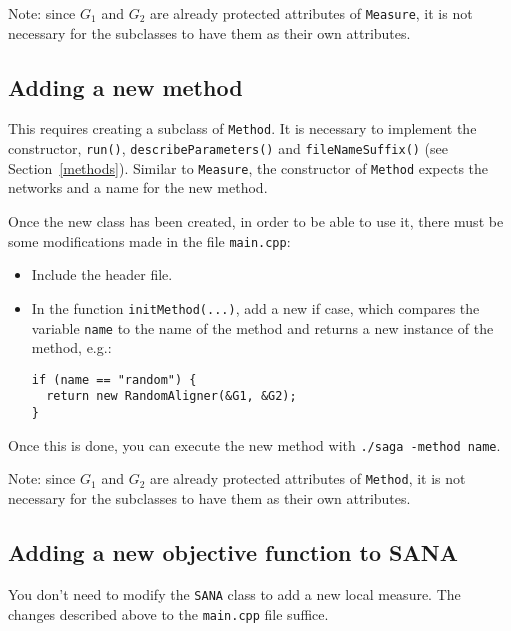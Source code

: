 \documentclass[]{article}
\begin{document}
Note: since $G_1$ and $G_2$ are already protected attributes of \texttt{Measure}, it is not necessary for the subclasses to have them as their own attributes.

\subsection{Adding a new method}
This requires creating a subclass of \texttt{Method}. It is necessary to implement the constructor, \texttt{run()}, \texttt{describeParameters()} and \texttt{fileNameSuffix()} (see Section~\ref{methods}). Similar to \texttt{Measure}, the constructor of \texttt{Method} expects the networks and a name for the new method.

Once the new class has been created, in order to be able to use it, there must be some modifications made in the file \texttt{main.cpp}:
\begin{itemize}
\item Include the header file.
\item In the function \texttt{initMethod(...)}, add a new if case, which compares the variable \texttt{name} to the name of the method and returns a new instance of the method, e.g.:
\begin{verbatim}
if (name == "random") {
  return new RandomAligner(&G1, &G2);
}
\end{verbatim}
\end{itemize}
Once this is done, you can execute the new method with \texttt{./saga -method name}.

Note: since $G_1$ and $G_2$ are already protected attributes of \texttt{Method}, it is not necessary for the subclasses to have them as their own attributes.

\subsection{Adding a new objective function to SANA}

You don't need to modify the \texttt{SANA} class to add a new local measure. The changes described above to the \texttt{main.cpp} file suffice.
\end{document}
